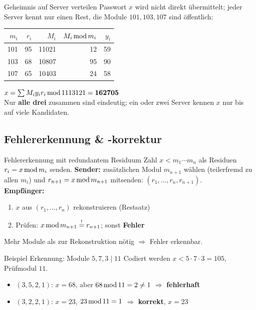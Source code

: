 \documentclass[a4paper, fontsize=7pt]{scrartcl}
\newcommand{\Mod}{\mskip3mu\mathrm{mod}\mskip3mu}
\renewcommand*{\arraystretch}{1.5}  %
\begin{document}
\begin{subbox}{Geheimnis auf Server verteilen}
Passwort $x$ wird nicht direkt übermittelt; jeder Server kennt nur einen
Rest, die Module $101, 103, 107$ sind öffentlich:
\renewcommand*{\arraystretch}{1.1}
\begin{center}
\setlength{\tabcolsep}{4pt}
\begin{tabular}{@{}rr|rrr@{}}
$m_i$ & $r_i$ & $M_i$ & $M_i \Mod m_i$ & $y_i$ \\
\hline
101 & 95 & 11021 & 12 & 59 \\
103 & 68 & 10807 & 95 & 90 \\
107 & 65 & 10403 & 24 & 58 \\
\end{tabular}
\end{center}
$x = \sum M_i y_i r_i \Mod 1113121 = \mathbf{162705}$\\
Nur \textbf{alle drei} zusammen sind eindeutig; ein oder zwei Server kennen
$x$ nur bis auf viele Kandidaten.
\end{subbox}

\subsection{Fehlererkennung \& -korrektur}

\begin{mainbox}{Fehlererkennung mit redundantem Residuum}
Zahl $x < m_1 \cdots m_n$ als Residuen $r_i = x \Mod m_i$ senden.
\textbf{Sender:} zusätzlichen Modul $m_{n+1}$ wählen (teilerfremd zu allen
$m_i$) und $r_{n+1} = x \Mod m_{n+1}$ mitsenden:
$(r_1, \ldots, r_n, r_{n+1})$.\\
\textbf{Empfänger:}
\begin{enumerate}
    \item $x$ aus $(r_1, \ldots, r_n)$ rekonstruieren (Restsatz)
    \item Prüfen: $x \Mod m_{n+1} \overset{!}{=} r_{n+1}$; sonst
          \textbf{Fehler}
\end{enumerate}
Mehr Module als zur Rekonstruktion nötig $\Rightarrow$ Fehler erkennbar.
\end{mainbox}

\begin{subbox}{Beispiel Erkennung: Module $5, 7, 3 \mid 11$}
Codiert werden $x < 5 \cdot 7 \cdot 3 = 105$, Prüfmodul $11$.
\begin{itemize}
    \item $(3,5,2,1)$: $x = 68$, aber $68 \Mod 11 = 2 \neq 1$
          $\Rightarrow$ \textbf{fehlerhaft}
    \item $(3,2,2,1)$: $x = 23$, $23 \Mod 11 = 1$ \checkmark{}
          $\Rightarrow$ \textbf{korrekt}, $x = 23$
\end{itemize}
\end{subbox}
\end{document}
